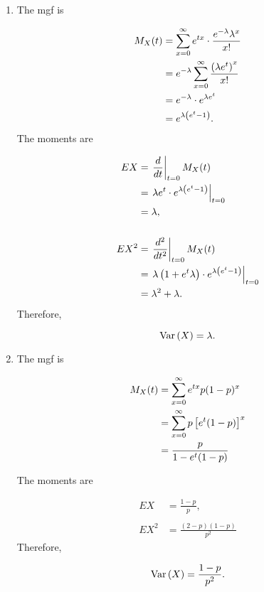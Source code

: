 \documentclass[12pt,letterpaper,reqno]{amsart}
\numberwithin{equation}{subsection}
\begin{document}
\begin{enumerate}[label=(\alph*),leftmargin=*]
    \item The mgf is
    
    \begin{align*}
        {M_X}\! \left( {t} \right) &= \sum_{x=0}^{\infty} e^{tx} \cdot \frac{e^{-\lambda} \lambda^x}{x!} \\
        &= e^{-\lambda} \sum_{x=0}^{\infty} \frac{\left(  \lambda e^t \right)^x}{x!} \\
        &= e^{-\lambda} \cdot e^{\lambda e^t} \\
        &= e^{\lambda \left( e^t - 1 \right)}.
    \end{align*}
    The moments are
    
    \begin{align*}
        EX &= \left.\frac{d{}}{d{t}}\right\vert_{t=0} M_X(t) \\
        &= \left. \lambda e^t \cdot e^{\lambda \left( e^t - 1 \right)} \right\vert_{t=0} \\
        &= \lambda, \\
        \\
        EX^2 &= \left.\frac{d{^2}}{d{t^2}}\right\vert_{t=0} M_X(t) \\
        &= \left. \lambda \left( 1 + e^t \lambda \right) \cdot e^{\lambda \left( e^t - 1 \right)} \right\vert_{t=0} \\
        &= \lambda^2 + \lambda.
    \end{align*}
    Therefore,
    
    \[ \operatorname{Var}\left( {X} \right) = \lambda. \]
    
    \item The mgf is
    
    \begin{align*}
        {M_X}\! \left( {t} \right) &= \sum_{x=0}^{\infty} e^{tx} p(1-p)^x \\
        &= \sum_{x=0}^{\infty} p \left[ e^t (1-p) \right]^x \\
        &= \frac{p}{1-e^t(1-p)}
    \end{align*}
    
    The moments are
    
    \begin{align*}
        EX &= \frac{1-p}{p}, \\
        \\
        EX^2 &= \frac{(2-p)(1-p)}{p^2}
    \end{align*}
    Therefore,
    
    \begin{align*}
        \operatorname{Var}\left( {X} \right) = \frac{1-p}{p^2}.
    \end{align*}
    

\end{enumerate}
\end{document}
